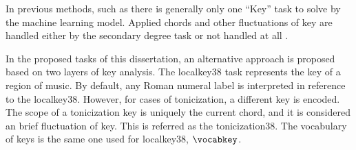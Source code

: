 
In previous methods, such as \textcite{chen2018functional,
chen2019harmony, micchi2020not, micchi2021deep,
mcleod2021modular} there is generally only one ``Key'' task
to solve by the machine learning model. Applied chords and
other fluctuations of key are handled either by the
secondary degree task \parencite{chen2021attend,
micchi2021deep} or not handled at all
\parencite{mcleod2021modular}.

In the proposed tasks of this dissertation, an alternative
approach is proposed based on two layers of key analysis.
The \gls{localkey38} task represents the key of a region of
music. By default, any Roman numeral label is interpreted in
reference to the \gls{localkey38}. However, for cases of
tonicization, a different key is encoded. The scope of a
tonicization key is uniquely the current chord, and it is
considered an brief fluctuation of key. This is referred as
the \gls{tonicization38}. The vocabulary of keys is the same
one used for \gls{localkey38}, $\vocabkey$.
